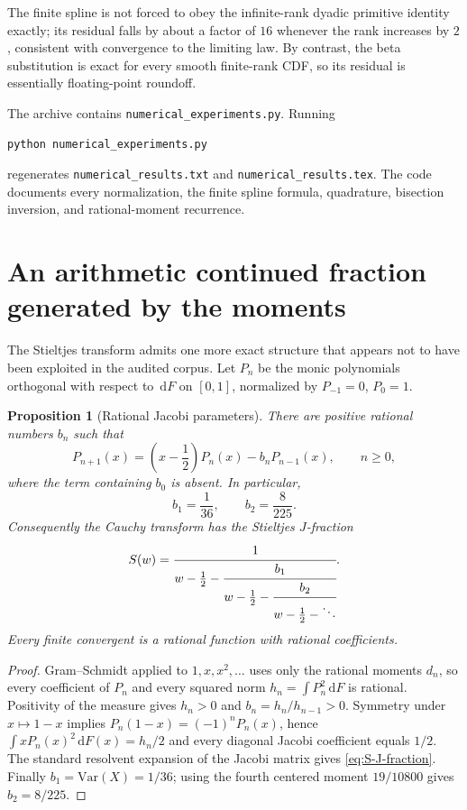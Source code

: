 \documentclass[11pt,oneside]{article}
\newtheorem{proposition}[theorem]{Proposition}
\theoremstyle{definition}
\theoremstyle{remark}
\newcommand{\dd}{\,\mathrm d}
\begin{document}
The finite spline is not forced to obey the infinite-rank dyadic primitive identity exactly; its residual falls by about a factor of $16$ whenever the rank increases by $2$, consistent with convergence to the limiting law.  By contrast, the beta substitution is exact for every smooth finite-rank CDF, so its residual is essentially floating-point roundoff.

The archive contains \texttt{numerical\_experiments.py}.  Running
\begin{lstlisting}[language=bash]
python numerical_experiments.py
\end{lstlisting}
regenerates \texttt{numerical\_results.txt} and
\texttt{numerical\_results.tex}.  The code documents every normalization, the finite spline formula, quadrature, bisection inversion, and rational-moment recurrence.

\section{An arithmetic continued fraction generated by the moments}

The Stieltjes transform admits one more exact structure that appears not to have been exploited in the audited corpus.  Let $P_n$ be the monic polynomials orthogonal with respect to $\dd F$ on $[0,1]$, normalized by $P_{-1}=0$, $P_0=1$.

\begin{proposition}[Rational Jacobi parameters]\label{prop:rational-Jacobi}
There are positive rational numbers $b_n$ such that
\begin{equation}\label{eq:orthogonal-recurrence}
 P_{n+1}(x)=\left(x-\frac12\right)P_n(x)-b_nP_{n-1}(x),
 \qquad n\ge0,
\end{equation}
where the term containing $b_0$ is absent.  In particular,
\begin{equation}\label{eq:first-Jacobi}
 b_1=\frac1{36},
 \qquad b_2=\frac8{225}.
\end{equation}
Consequently the Cauchy transform has the Stieltjes $J$-fraction
\begin{equation}\label{eq:S-J-fraction}
 S(w)=\cfrac{1}{w-\frac12-
 \cfrac{b_1}{w-\frac12-
 \cfrac{b_2}{w-\frac12-\ddots}}}.
\end{equation}
Every finite convergent is a rational function with rational coefficients.
\end{proposition}

\begin{proof}
Gram--Schmidt applied to $1,x,x^2,\ldots$ uses only the rational moments $d_n$, so every coefficient of $P_n$ and every squared norm
$h_n=\int P_n^2\dd F$ is rational.  Positivity of the measure gives $h_n>0$ and $b_n=h_n/h_{n-1}>0$.  Symmetry under $x\mapsto1-x$ implies
$P_n(1-x)=(-1)^nP_n(x)$, hence
$\int xP_n(x)^2\dd F(x)=h_n/2$ and every diagonal Jacobi coefficient equals $1/2$.  The standard resolvent expansion of the Jacobi matrix gives \eqref{eq:S-J-fraction}.  Finally \(b_1=\mathrm{Var}(X)=1/36\); using the fourth centered moment $19/10800$ gives $b_2=8/225$.
\end{proof}
\end{document}
